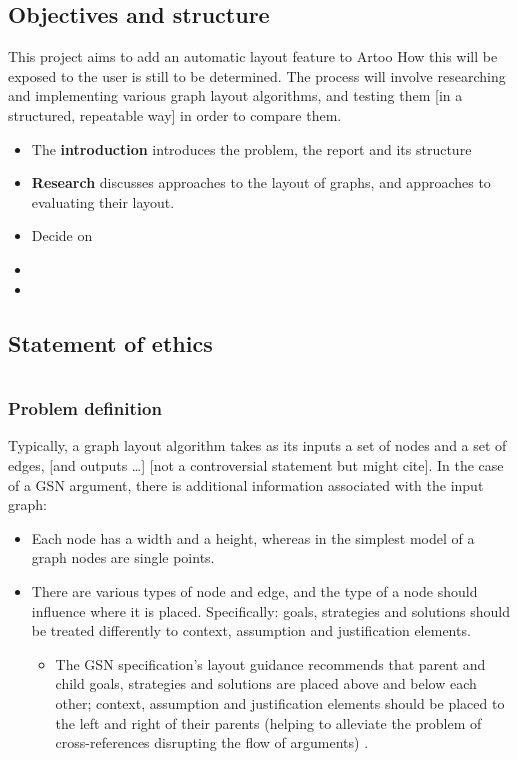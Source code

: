 \section{Objectives and structure}

This project aims to add an automatic layout feature to Artoo
How this will be exposed to the user is still to be determined. 
The process will involve researching and implementing various graph layout algorithms,
and testing them [in a structured, repeatable way] in order to compare them. 

\begin{itemize}
\item The \textbf{introduction} introduces the problem, the report and its structure
\item \textbf{Research} discusses approaches to the layout of graphs, and approaches to evaluating their layout.
\item Decide on
\item
\item
\end{itemize}

\section{Statement of ethics}


\chapter{}

\subsection{Problem definition}

Typically, a graph layout algorithm takes as its inputs a set of nodes and a set of edges, [and outputs \ldots] [not a controversial statement but might cite].
In the case of a GSN argument, there is additional information associated with the input graph:

\begin{itemize}
  \item
    Each node has a width and a height, whereas in the simplest model of a graph nodes are single points. 
  \item
    There are various types of node and edge, and the type of a node should influence where it is placed. Specifically: goals, strategies and solutions should be treated differently to context, assumption and justification elements.
    \begin{itemize}
    \item The GSN specification's layout guidance \citep[section~2.2, pp.~26--27]{gsnstandard} recommends that parent and child goals, strategies and solutions are placed above and below each other; context, assumption and justification elements should be placed to the left and right of their parents (helping to alleviate the problem of cross-references disrupting the flow of arguments) .
    \end{itemize}
\end{itemize}


